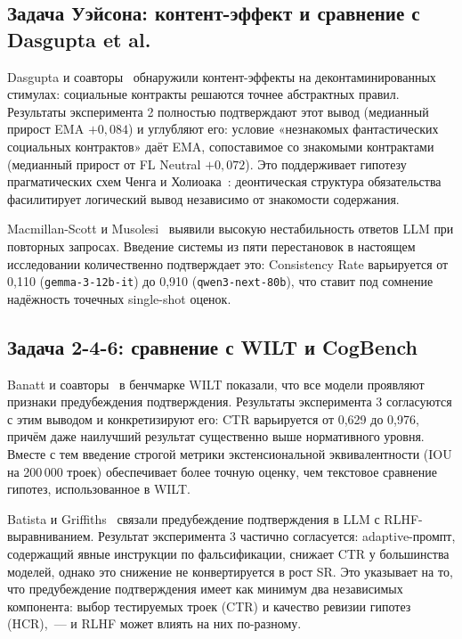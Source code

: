 \subsection{Задача Уэйсона: контент-эффект и сравнение с Dasgupta et al.}

Dasgupta и соавторы~\cite{dasgupta2024language} обнаружили контент-эффекты на деконтаминированных стимулах: социальные контракты решаются точнее абстрактных правил. Результаты эксперимента 2 полностью подтверждают этот вывод (медианный прирост EMA $+0{,}084$) и углубляют его: условие «незнакомых фантастических социальных контрактов» даёт EMA, сопоставимое со знакомыми контрактами (медианный прирост от FL Neutral $+0{,}072$). Это поддерживает гипотезу прагматических схем Ченга и Холиоака~\cite{cheng1985pragmatic}: деонтическая структура обязательства фасилитирует логический вывод независимо от знакомости содержания.

Macmillan-Scott и Musolesi~\cite{macmillan2024irrationality} выявили высокую нестабильность ответов LLM при повторных запросах. Введение системы из пяти перестановок в настоящем исследовании количественно подтверждает это: Consistency Rate варьируется от 0{,}110 (\texttt{gemma-3-12b-it}) до 0{,}910 (\texttt{qwen3-next-80b}), что ставит под сомнение надёжность точечных single-shot оценок.

\subsection{Задача 2-4-6: сравнение с WILT и CogBench}

Banatt и соавторы~\cite{banatt2024wilt} в бенчмарке WILT показали, что все модели проявляют признаки предубеждения подтверждения. Результаты эксперимента 3 согласуются с этим выводом и конкретизируют его: CTR варьируется от 0{,}629 до 0{,}976, причём даже наилучший результат существенно выше нормативного уровня. Вместе с тем введение строгой метрики экстенсиональной эквивалентности (IOU на 200\,000 троек) обеспечивает более точную оценку, чем текстовое сравнение гипотез, использованное в WILT.

Batista и Griffiths~\cite{batista2026rational} связали предубеждение подтверждения в LLM с RLHF-выравниванием. Результат эксперимента 3 частично согласуется: adaptive-промпт, содержащий явные инструкции по фальсификации, снижает CTR у большинства моделей, однако это снижение не конвертируется в рост SR. Это указывает на то, что предубеждение подтверждения имеет как минимум два независимых компонента: выбор тестируемых троек (CTR) и качество ревизии гипотез (HCR),~--- и RLHF может влиять на них по-разному.

